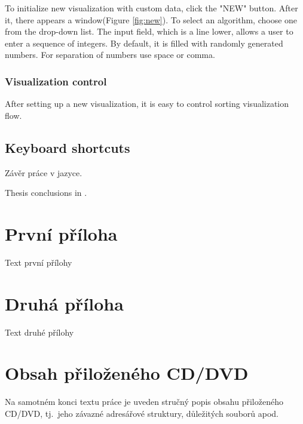 \documentclass[
  field=inf,
  biblatex,
  language=english,
  glossaries,
  theorems=false,
  index
]{kidiplom}
\begin{document}
To initialize new visualization with custom data, click the "NEW" button. After it, there appears a window(Figure \ref{fig:new}). To select an algorithm, choose one from the drop-down list. The input field, which is a line lower, allows a user to enter a sequence of integers. By default, it is filled with randomly generated numbers. For separation of numbers use space or comma.

\subsubsection{Visualization control}

After setting up a new visualization, it is easy to control sorting visualization flow.

\subsection{Keyboard shortcuts}

\begin{kiconclusions}
Závěr práce v  jazyce.
\end{kiconclusions}

\begin{kiconclusions}[english]
Thesis conclusions in .
\end{kiconclusions}

\appendix

\section{První příloha}
Text první přílohy

\section{Druhá příloha}
Text druhé přílohy

\section{Obsah přiloženého CD/DVD} \label{sec:ObsahCD}

Na samotném konci textu práce je uveden stručný popis obsahu
přiloženého CD/DVD, tj.~jeho závazné adresářové struktury, důležitých
souborů apod.
\end{document}
